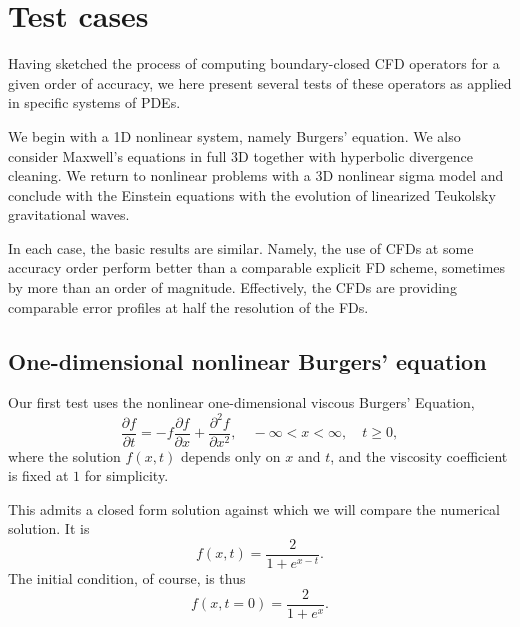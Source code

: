 
\section{Test cases}

Having sketched the process of computing boundary-closed CFD operators for a given order of accuracy, we here present several tests of these operators as applied in specific systems of PDEs.  

We begin with a 1D nonlinear system, namely Burgers' equation.  We also consider Maxwell's equations in full 3D together with hyperbolic divergence cleaning.  We return to nonlinear problems with a 3D nonlinear sigma model and conclude with the Einstein equations with the evolution of linearized Teukolsky gravitational waves. 

In each case, the basic results are similar.  Namely, the use of CFDs at some accuracy order perform better than a comparable explicit FD scheme, sometimes by more than an order of magnitude.  Effectively, the CFDs are providing comparable error profiles at half the resolution of the FDs.  





\subsection{One-dimensional nonlinear Burgers' equation}

Our first test uses the nonlinear one-dimensional viscous Burgers' Equation,
\begin{equation}
    \frac{\partial f}{\partial t} = -f\frac{\partial f}{\partial x} + \frac{\partial^2 f}{\partial x^2}, \quad -\infty < x < \infty, \quad t \ge 0, \label{eq:BurgersEq}
\end{equation}
where the solution $f(x,t)$ depends only on $x$ and $t$, and the viscosity coefficient is fixed at $1$ for simplicity.

This admits a closed form solution against which we will compare the numerical solution.  It is 
\begin{equation}
    f(x,t) = \frac{2}{1+e^{x-t}}.
\end{equation}
The initial condition, of course, is thus 
\begin{equation}
    f(x,t=0) = \frac{2}{1+e^x}.
\end{equation}

